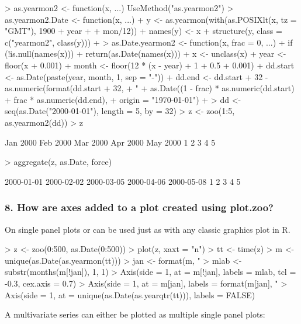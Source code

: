 \documentclass{Z}
\newcommand{\mysection}[1]{\subsubsection[#1]{\textbf{#1}}}
\begin{document}
\begin{Schunk}
\begin{Sinput}
> as.yearmon2 <- function(x, ...) UseMethod("as.yearmon2")
> as.yearmon2.Date <- function(x, ...) {
+     y <- as.yearmon(with(as.POSIXlt(x, tz = "GMT"), 1900 + year + 
+         mon/12))
+     names(y) <- x
+     structure(y, class = c("yearmon2", class(y)))
+ }
> as.Date.yearmon2 <- function(x, frac = 0, ...) {
+     if (!is.null(names(x))) 
+         return(as.Date(names(x)))
+     x <- unclass(x)
+     year <- floor(x + 0.001)
+     month <- floor(12 * (x - year) + 1 + 0.5 + 0.001)
+     dd.start <- as.Date(paste(year, month, 1, sep = "-"))
+     dd.end <- dd.start + 32 - as.numeric(format(dd.start + 32, 
+         "%
+     as.Date((1 - frac) * as.numeric(dd.start) + frac * as.numeric(dd.end), 
+         origin = "1970-01-01")
+ }
> dd <- seq(as.Date("2000-01-01"), length = 5, by = 32)
> z <- zoo(1:5, as.yearmon2(dd))
> z
\end{Sinput}
\begin{Soutput}
Jan 2000 Feb 2000 Mar 2000 Apr 2000 May 2000 
       1        2        3        4        5 
\end{Soutput}
\begin{Sinput}
> aggregate(z, as.Date, force)
\end{Sinput}
\begin{Soutput}
2000-01-01 2000-02-02 2000-03-05 2000-04-06 2000-05-08 
         1          2          3          4          5 
\end{Soutput}
\end{Schunk}

\mysection{8. How are axes added to a plot created using plot.zoo?}

On single panel plots  or  can be used just as with any 
classic graphics plot in R.

\begin{Schunk}
\begin{Sinput}
> z <- zoo(0:500, as.Date(0:500))
> plot(z, xaxt = "n")
> tt <- time(z)
> m <- unique(as.Date(as.yearmon(tt)))
> jan <- format(m, "%
> mlab <- substr(months(m[!jan]), 1, 1)
> Axis(side = 1, at = m[!jan], labels = mlab, tcl = -0.3, cex.axis = 0.7)
> Axis(side = 1, at = m[jan], labels = format(m[jan], "%
> Axis(side = 1, at = unique(as.Date(as.yearqtr(tt))), labels = FALSE)
\end{Sinput}
\end{Schunk}

A multivariate series can either be plotted as multiple single panel
plots:
\end{document}
